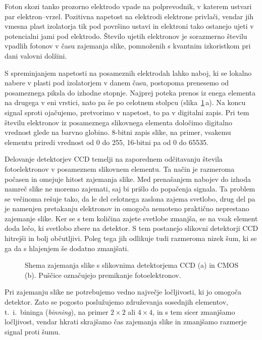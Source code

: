 Foton skozi tanko prozorno elektrodo vpade na polprevodnik, v katerem ustvari
par elektron--vrzel. Pozitivna napetost na elektrodi elektrone privlači, vendar jih 
vmesna plast izolatorja tik pod površino ustavi in elektroni tako ostanejo ujeti v potencialni jami
pod elektrodo. Število ujetih elektronov je sorazmerno številu vpadlih fotonov v času zajemanja slike, 
pomnoženih s kvantnim izkoristkom pri dani valovni dolžini. 

S spreminjanjem napetosti na posameznih elektrodah lahko naboj, ki se lokalno nabere 
v plasti pod izolatorjem v danem času, postopoma prenesemo od posameznega 
piksla do izhodne stopnje. Najprej poteka prenos iz enega elementa na drugega v eni vrstici, 
nato pa še po celotnem stolpcu (slika~\ref{11_CCD}\,a). Na koncu signal sproti ojačujemo, 
pretvorimo v napetost, to pa v digitalni zapis. Pri tem številu elektronov iz posameznega
slikovnega elementa določimo digitalno vrednost glede na barvno globino. 8-bitni zapis slike, 
na primer, vsakemu elementu priredi vrednost od 0 do 255, 16-bitni pa od 0 do 65535.

Delovanje detektorjev CCD temelji na zaporednem odčitavanju števila fotoelektronov v posameznem 
slikovnem elementu. Ta način je razmeroma počasen in omejuje hitost zajemanja slike. Med 
prenašanjem nabojev do izhoda namreč slike ne moremo zajemati, saj bi prišlo do popačenja signala. 
Ta problem se večinoma rešuje tako, da le del celotnega zaslona zajema svetlobo, drug del
pa je namenjen pretakanju elektronov in omogoča nemoteno praktično neprestano zajemanje slike.
Ker se s tem količina zajete svetlobe zmanjša, se na vsak element doda lečo, ki svetlobo zbere
na detektor. S tem postanejo slikovni detektorji CCD hitrejši in bolj občutljivi. Poleg
tega jih odlikuje tudi razmeroma nizek šum, ki se ga da s hlajenjem še dodatno 
zmanjšati. 

\begin{figure}[h]
\centering
\def\svgwidth{100truemm} 

\caption{Shema zajemanja slike s slikovnima detektorjema CCD (a) in  CMOS (b). Puščice označujejo premikanje
fotoelektronov.}
\label{11_CCD}
\end{figure}

\begin{remark}
Pri zajemanju slike ne potrebujemo vedno največje ločljivosti, ki jo omogoča detektor. 
Zato se pogosto poslužujemo združevanja sosednjih elementov, t.\ i.\ bininga ({\it binning}), 
na primer $2\times2$ ali $4\times4$, in s tem sicer zmanjšamo ločljivost, vendar hkrati skrajšamo čas
zajemanja slike in zmanjšamo razmerje signal proti šumu. 
\end{remark}


